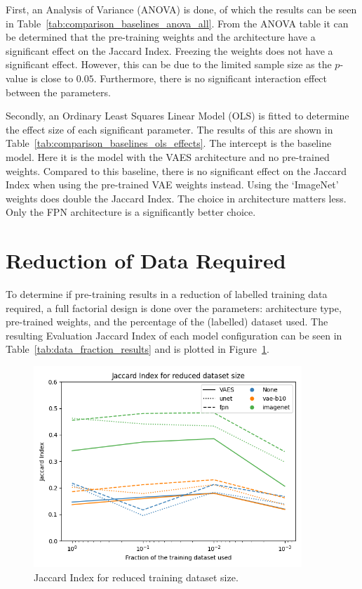 First, an Analysis of Variance (ANOVA) is done, of which the results can be seen in Table~\ref{tab:comparison_baselines_anova_all}. From the ANOVA table it can be determined that the pre-training weights and the architecture have a significant effect on the Jaccard Index. Freezing the weights does not have a significant effect. However, this can be due to the limited sample size as the $p$-value is close to $0.05$. Furthermore, there is no significant interaction effect between the parameters. 

Secondly, an Ordinary Least Squares Linear Model (OLS) is fitted to determine the effect size of each significant parameter. The results of this are shown in Table~\ref{tab:comparison_baselines_ols_effects}. The intercept is the baseline model. Here it is the model with the VAES architecture and no pre-trained weights. Compared to this baseline, there is no significant effect on the Jaccard Index when using the pre-trained VAE weights instead. Using the `ImageNet' weights does double the Jaccard Index. The choice in architecture matters less. Only the FPN architecture is a significantly better choice. 



\section{Reduction of Data Required}
To determine if pre-training results in a reduction of labelled training data required, a full factorial design is done over the parameters: architecture type, pre-trained weights, and the percentage of the (labelled) dataset used. The resulting Evaluation Jaccard Index of each model configuration can be seen in Table~\ref{tab:data_fraction_results} and is plotted in Figure~\ref{fig:dataset-fraction-results}.


\begin{figure}[h]
    \centering
    \includegraphics[width=0.9\textwidth]{figures/data_percentage/line-plot.png}
    \caption{Jaccard Index for reduced training dataset size.}
    \label{fig:dataset-fraction-results}
\end{figure}

